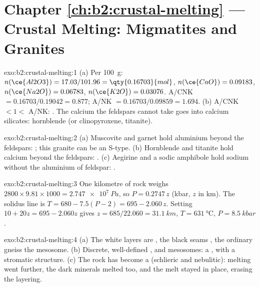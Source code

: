 \section*{Chapter \ref{ch:b2:crustal-melting} --- Crustal Melting: Migmatites and Granites}

\begin{solution}{exo:b2:crustal-melting:1}
(a) Per \qty{100}{\gram}: $n(\ce{Al2O3}) = 17.03/101.96 = \qty{0.16703}{mol}$,
$n(\ce{CaO}) = 0.09183$, $n(\ce{Na2O}) = 0.06783$, $n(\ce{K2O}) = 0.03076$.
A/CNK $= 0.16703/0.19042 = 0.877$; A/NK $= 0.16703/0.09859 = 1.694$.
(b) A/CNK $< 1 <$ A/NK: . The calcium the feldspars cannot take goes into
calcium silicates: hornblende (or clinopyroxene, titanite).
\end{solution}

\begin{solution}{exo:b2:crustal-melting:2}
(a) Muscovite and garnet hold aluminium beyond the feldspars: ; this granite
can be an S-type. (b) Hornblende and titanite hold calcium beyond the feldspars:
. (c) Aegirine and a sodic amphibole hold sodium without the aluminium
of feldspar: .
\end{solution}

\begin{solution}{exo:b2:crustal-melting:3}
One kilometre of rock weighs $2800\times9.81\times1000 = \qty{2.747e7}{Pa}$, so
$P = 0.2747\,z$ (\unit{kbar}, $z$ in \unit{km}). The solidus line is $T = 680 - 7.5(P -
2) = 695 - 2.060\,z$. Setting $10 + 20z = 695 - 2.060z$ gives $z = 685/22.060 =
\qty{31.1}{km}$, $T = \qty{631}{\celsius}$, $P = \qty{8.5}{kbar}$.
\end{solution}

\begin{solution}{exo:b2:crustal-melting:4}
(a) The white layers are , the black seams , the ordinary gneiss the
mesosome. (b) Discrete, well-defined ,  and mesosomes: a ,
with a stromatic structure. (c) The rock has become a  (schlieric and nebulitic):
melting went further, the dark minerals melted too, and the melt stayed in place,
erasing the layering.
\end{solution}

